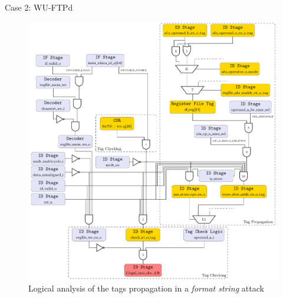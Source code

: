\begin{frame}[noframenumbering]{Case 2: WU-FTPd}
    \begin{figure}
        \centering
        \includegraphics[height=.85\textheight]{src/2_vuln_assessment/img/wuftpd/arborescence_wuftpd.pdf}
        \caption{Logical analysis of the tags propagation in a \textit{format string} attack}
        \label{fig:analyseLogiqueFormatString}
    \end{figure}
\end{frame}


